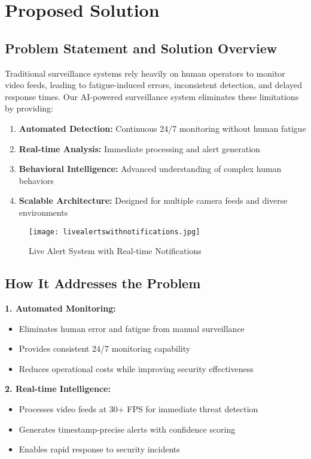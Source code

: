 \documentclass[12pt,a4paper]{article}
\begin{document}
\section{Proposed Solution}

\subsection{Problem Statement and Solution Overview}

Traditional surveillance systems rely heavily on human operators to monitor video feeds, leading to fatigue-induced errors, inconsistent detection, and delayed response times. Our AI-powered surveillance system eliminates these limitations by providing:

\begin{enumerate}[leftmargin=*]
    \item \textbf{Automated Detection:} Continuous 24/7 monitoring without human fatigue
    \item \textbf{Real-time Analysis:} Immediate processing and alert generation
    \item \textbf{Behavioral Intelligence:} Advanced understanding of complex human behaviors
    \item \textbf{Scalable Architecture:} Designed for multiple camera feeds and diverse environments
\end{enumerate}

\begin{figure}[H]
    \centering
    \texttt{[image: livealertswithnotifications.jpg]}
    \caption{Live Alert System with Real-time Notifications}
    \label{fig:live_alerts}
\end{figure}

\subsection{How It Addresses the Problem}

\textbf{1. Automated Monitoring:}
\begin{itemize}
    \item Eliminates human error and fatigue from manual surveillance
    \item Provides consistent 24/7 monitoring capability
    \item Reduces operational costs while improving security effectiveness
\end{itemize}

\textbf{2. Real-time Intelligence:}
\begin{itemize}
    \item Processes video feeds at 30+ FPS for immediate threat detection
    \item Generates timestamp-precise alerts with confidence scoring
    \item Enables rapid response to security incidents
\end{itemize}
\end{document}
